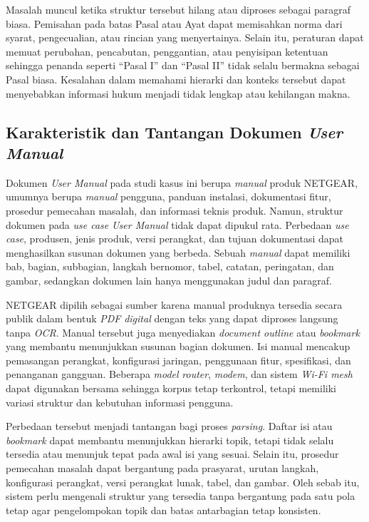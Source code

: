Masalah muncul ketika struktur tersebut hilang atau diproses sebagai paragraf
biasa. Pemisahan pada batas Pasal atau Ayat dapat memisahkan norma dari syarat,
pengecualian, atau rincian yang menyertainya. Selain itu, peraturan dapat
memuat perubahan, pencabutan, penggantian, atau penyisipan ketentuan sehingga
penanda seperti ``Pasal I'' dan ``Pasal II'' tidak selalu bermakna sebagai
Pasal biasa. Kesalahan dalam memahami hierarki dan konteks tersebut dapat
menyebabkan informasi hukum menjadi tidak lengkap atau kehilangan makna.

\subsection{Karakteristik dan Tantangan Dokumen \emph{User Manual}}
\label{subsec:analisis-dokumen-user-manual}

Dokumen \emph{User Manual} pada studi kasus ini berupa \emph{manual} produk
NETGEAR, umumnya berupa \emph{manual} pengguna, panduan instalasi, dokumentasi fitur,
prosedur pemecahan masalah, dan informasi teknis produk. Namun, struktur dokumen
pada \emph{use case} \emph{User Manual} tidak dapat dipukul rata. Perbedaan \emph{use case},
produsen, jenis produk, versi perangkat, dan tujuan dokumentasi dapat menghasilkan
susunan dokumen yang berbeda. Sebuah \emph{manual} dapat memiliki bab, bagian,
subbagian, langkah bernomor, tabel, catatan, peringatan, dan gambar, sedangkan
dokumen lain hanya menggunakan judul dan paragraf.

NETGEAR dipilih sebagai sumber karena manual produknya tersedia secara publik dalam
bentuk \emph{PDF} \emph{digital} dengan teks yang dapat diproses langsung tanpa \emph{OCR}. Manual tersebut
juga menyediakan \emph{document outline} atau \emph{bookmark} yang membantu menunjukkan
susunan bagian dokumen. Isi manual mencakup pemasangan perangkat, konfigurasi jaringan,
penggunaan fitur, spesifikasi, dan penanganan gangguan. Beberapa \emph{model} \emph{router}, \emph{modem},
dan sistem \emph{Wi-Fi mesh} dapat digunakan bersama sehingga korpus tetap terkontrol,
tetapi memiliki variasi struktur dan kebutuhan informasi pengguna.

Perbedaan tersebut menjadi tantangan bagi proses \emph{parsing}. Daftar isi atau
\emph{bookmark} dapat membantu menunjukkan hierarki topik, tetapi tidak selalu
tersedia atau menunjuk tepat pada awal isi yang sesuai. Selain itu, prosedur
pemecahan masalah dapat bergantung pada prasyarat, urutan langkah, konfigurasi
perangkat, versi perangkat lunak, tabel, dan gambar. Oleh sebab itu, sistem perlu
mengenali struktur yang tersedia tanpa bergantung pada satu pola tetap agar
pengelompokan topik dan batas antarbagian tetap konsisten.

